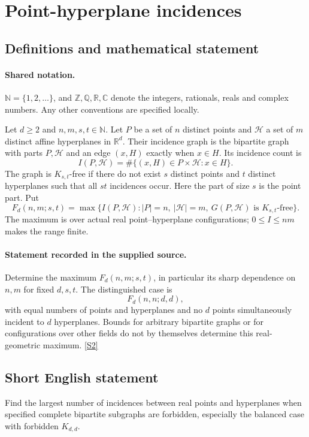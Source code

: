 \documentclass[11pt]{article}
\newcommand{\sref}[2]{\hyperlink{source:#1:#2}{[S#2]}}
\begin{document}
\section{Point-hyperplane incidences}\label{statement}

\subsection{Definitions and mathematical statement}

\paragraph{Shared notation.}$\mathbb N=\{1,2,\ldots\}$, and $\mathbb Z,\mathbb Q,\mathbb R,\mathbb C$ denote the integers, rationals, reals and complex numbers. Any other conventions are specified locally.


Let $d\ge2$ and $n,m,s,t\in\mathbb N$. Let $P$ be a set of $n$ distinct points and $\mathcal H$ a set of $m$ distinct affine hyperplanes in $\mathbb R^d$. Their incidence graph is the bipartite graph with parts $P,\mathcal H$ and an edge $(x,H)$ exactly when $x\in H$. Its incidence count is
\[
 I(P,\mathcal H)=\#\{(x,H)\in P\times\mathcal H:x\in H\}.
\]
The graph is $K_{s,t}$-free if there do not exist $s$ distinct points and $t$ distinct hyperplanes such that all $st$ incidences occur. Here the part of size $s$ is the point part. Put
\[
 F_d(n,m;s,t)=\max\{I(P,\mathcal H):|P|=n,\ |\mathcal H|=m,\ G(P,\mathcal H)\text{ is }K_{s,t}\text{-free}\}.
\]
The maximum is over actual real point--hyperplane configurations; $0\le I\le nm$ makes the range finite.
\paragraph{Statement recorded in the supplied source.}
Determine the maximum $F_d(n,m;s,t)$, in particular its sharp dependence on $n,m$ for fixed $d,s,t$. The distinguished case is
\[
 F_d(n,n;d,d),
\]
with equal numbers of points and hyperplanes and no $d$ points simultaneously incident to $d$ hyperplanes. Bounds for arbitrary bipartite graphs or for configurations over other fields do not by themselves determine this real-geometric maximum. \sref{statement}{2}
\subsection{Short English statement}
Find the largest number of incidences between real points and hyperplanes when specified complete bipartite subgraphs are forbidden, especially the balanced case with forbidden $K_{d,d}$.
\end{document}

